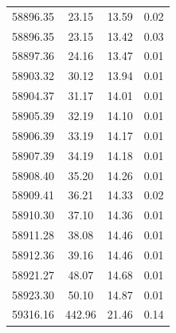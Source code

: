 \begin{longtable}{|c|c|c|c|}
 58896.35 &   23.15 &       13.59 &          0.02 \\
 58896.35 &   23.15 &       13.42 &          0.03 \\
 58897.36 &   24.16 &       13.47 &          0.01 \\
 58903.32 &   30.12 &       13.94 &          0.01 \\
 58904.37 &   31.17 &       14.01 &          0.01 \\
 58905.39 &   32.19 &       14.10 &          0.01 \\
 58906.39 &   33.19 &       14.17 &          0.01 \\
 58907.39 &   34.19 &       14.18 &          0.01 \\
 58908.40 &   35.20 &       14.26 &          0.01 \\
 58909.41 &   36.21 &       14.33 &          0.02 \\
 58910.30 &   37.10 &       14.36 &          0.01 \\
 58911.28 &   38.08 &       14.46 &          0.01 \\
 58912.36 &   39.16 &       14.46 &          0.01 \\
 58921.27 &   48.07 &       14.68 &          0.01 \\
 58923.30 &   50.10 &       14.87 &          0.01 \\
 59316.16 &  442.96 &       21.46 &          0.14 \\
 \end{longtable}

